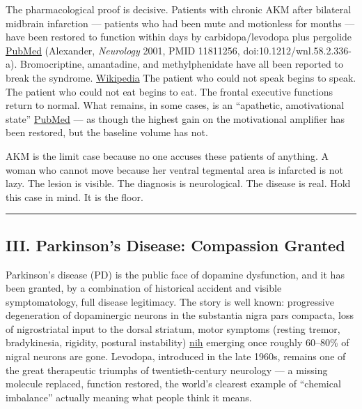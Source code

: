 The pharmacological proof is decisive. Patients with chronic AKM after bilateral midbrain infarction --- patients who had been mute and motionless for months --- have been restored to function within days by carbidopa/levodopa plus pergolide \href{https://pubmed.ncbi.nlm.nih.gov/11811256/}{PubMed} (Alexander, \emph{Neurology} 2001, PMID 11811256, doi:10.1212/wnl.58.2.336-a). Bromocriptine, amantadine, and methylphenidate have all been reported to break the syndrome. \href{https://en.wikipedia.org/wiki/Akinetic_mutism}{Wikipedia} The patient who could not speak begins to speak. The patient who could not eat begins to eat. The frontal executive functions return to normal. What remains, in some cases, is an ``apathetic, amotivational state'' \href{https://pubmed.ncbi.nlm.nih.gov/11811256/}{PubMed} --- as though the highest gain on the motivational amplifier has been restored, but the baseline volume has not.

AKM is the limit case because no one accuses these patients of anything. A woman who cannot move because her ventral tegmental area is infarcted is not lazy. The lesion is visible. The diagnosis is neurological. The disease is real. Hold this case in mind. It is the floor.

\begin{center}\rule{0.5\linewidth}{0.5pt}\end{center}

\subsection{III. Parkinson's Disease: Compassion Granted}\label{09_dopamine_spectrum-iii.-parkinsons-disease-compassion-granted}

Parkinson's disease (PD) is the public face of dopamine dysfunction, and it has been granted, by a combination of historical accident and visible symptomatology, full disease legitimacy. The story is well known: progressive degeneration of dopaminergic neurons in the substantia nigra pars compacta, loss of nigrostriatal input to the dorsal striatum, motor symptoms (resting tremor, bradykinesia, rigidity, postural instability) \href{https://www.ncbi.nlm.nih.gov/pmc/articles/PMC3263557/}{nih} emerging once roughly 60--80\% of nigral neurons are gone. Levodopa, introduced in the late 1960s, remains one of the great therapeutic triumphs of twentieth-century neurology --- a missing molecule replaced, function restored, the world's clearest example of ``chemical imbalance'' actually meaning what people think it means.

